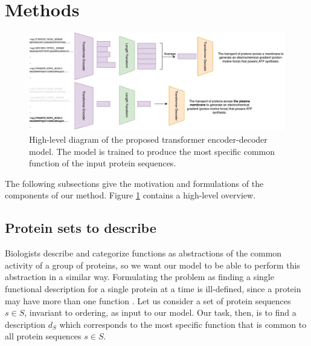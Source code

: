 \documentclass{article}
\begin{document}
\section{Methods}
\begin{figure}
    \centering
    \includegraphics[width=0.9\linewidth]{prot2go.png}
    \caption{High-level diagram of the proposed transformer encoder-decoder model.
The model is trained to produce the most specific common function of the input protein sequences.}
    \label{overview}
\end{figure}
The following subsections give the motivation and formulations of the components of our method. Figure \ref{overview} contains a high-level overview.

    
    \subsection{Protein sets to describe}
    Biologists describe and categorize functions as abstractions of the common activity of a group of proteins, so we want our model to be able to perform this abstraction in a similar way.
    Formulating the problem as finding a single functional description for a single protein at a time is ill-defined, since a protein may have more than one function \cite{jeffery2018protein}.
    Let us consider a set of protein sequences $s \in S$, invariant to ordering, as input to our model.
    Our task, then, is to find a description $d_{S}$ which corresponds to the most specific function that is common to all protein sequences $s \in S$.
\end{document}
